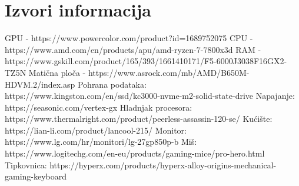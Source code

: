 \documentclass{article}
\begin{document}
\section{Izvori informacija}
GPU - https://www.powercolor.com/product?id=1689752075
\newline CPU - https://www.amd.com/en/products/apu/amd-ryzen-7-7800x3d
\newline RAM - https://www.gskill.com/product/165/393/1661410171/F5-6000J3038F16GX2-TZ5N
\newline Matična ploča - https://www.asrock.com/mb/AMD/B650M-HDVM.2/index.asp
\newline Pohrana podataka: https://www.kingston.com/en/ssd/kc3000-nvme-m2-solid-state-drive
\newline Napajanje: https://seasonic.com/vertex-gx
\newline Hladnjak procesora: https://www.thermalright.com/product/peerless-assassin-120-se/
\newline Kućište: https://lian-li.com/product/lancool-215/
\newline Monitor: https://www.lg.com/hr/monitori/lg-27gp850p-b
\newline Miš: https://www.logitechg.com/en-eu/products/gaming-mice/pro-hero.html
\newline Tipkovnica: https://hyperx.com/products/hyperx-alloy-origins-mechanical-gaming-keyboard
\end{document}
